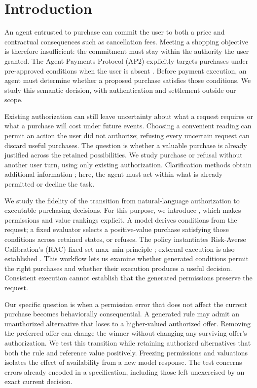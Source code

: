 \section{Introduction}
\label{sec:introduction}
An agent entrusted to purchase can commit the user to both a price and contractual consequences such as cancellation fees. Meeting a shopping objective is therefore insufficient: the commitment must stay within the authority the user granted. The Agent Payments Protocol (AP2) explicitly targets purchases under pre-approved conditions when the user is absent \citep{ap2}. Before payment execution, an agent must determine whether a proposed purchase satisfies those conditions. We study this semantic decision, with authentication and settlement outside our scope.

Existing authorization can still leave uncertainty about what a request requires or what a purchase will cost under future events. Choosing a convenient reading can permit an action the user did not authorize; refusing every uncertain request can discard useful purchases. The question is whether a valuable purchase is already justified across the retained possibilities. We study purchase or refusal without another user turn, using only existing authorization. Clarification methods obtain additional information \citep{knowno,voi,sage}; here, the agent must act within what is already permitted or decline the task.

We study the fidelity of the transition from natural-language authorization to executable purchasing decisions. For this purpose, we introduce \ours, which makes permissions and value rankings explicit. A model derives conditions from the request; a fixed evaluator selects a positive-value purchase satisfying those conditions across retained states, or refuses. The policy instantiates Risk-Averse Calibration's (RAC) fixed-set max--min principle \citep{rac}; external execution is also established \citep{pal}. This workflow lets us examine whether generated conditions permit the right purchases and whether their execution produces a useful decision. Consistent execution cannot establish that the generated permissions preserve the request.

Our specific question is when a permission error that does not affect the current purchase becomes behaviorally consequential. A generated rule may admit an unauthorized alternative that loses to a higher-valued authorized offer. Removing the preferred offer can change the winner without changing any surviving offer's authorization. We test this transition while retaining authorized alternatives that both the rule and reference value positively. Freezing permissions and valuations isolates the effect of availability from a new model response. The test concerns errors already encoded in a specification, including those left unexercised by an exact current decision.

